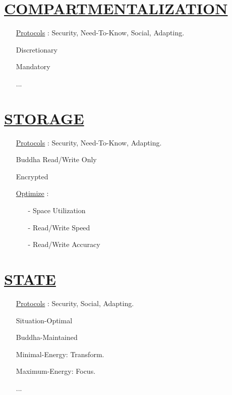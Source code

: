 \documentclass[11pt]{article}
\begin{document}
\section*{\ul{COMPARTMENTALIZATION}}
\begin{enumerate}
	\item[] \ul{Protocols} : Security, Need-To-Know, Social, Adapting.
	\item[] Discretionary
	\item[] Mandatory
	\item[] ...
\end{enumerate}


\section*{\ul{STORAGE}}
\begin{enumerate}
	\item[] \ul{Protocols} : Security, Need-To-Know, Adapting.
	\item[] Buddha Read/Write Only
	\item[] Encrypted
	\item[] \ul{Optimize}  :
	\begin{enumerate}
		\item[-] Space Utilization
		\item[-] Read/Write Speed
		\item[-] Read/Write Accuracy
	\end{enumerate}
\end{enumerate}


\section*{\ul{STATE}}
\begin{enumerate}
	\item[] \ul{Protocols} : Security, Social, Adapting.
	\item[] Situation-Optimal
	\item[] Buddha-Maintained
	\item[] Minimal-Energy: Transform.
	\item[] Maximum-Energy: Focus.
	\item[] ...
\end{enumerate}
\end{document}
